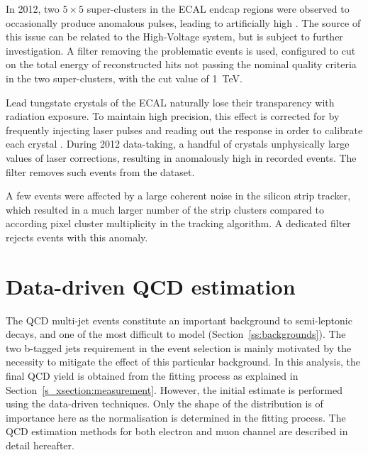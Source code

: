 \begin{description}[wide=\parindent]
	\item[Bad ECAL endcap super-cluster filter.] In 2012, two $5\times5$ super-clusters in the ECAL endcap regions were
	observed to occasionally produce anomalous pulses, leading to artificially high \MET. The source of this issue can
	be related to the High-Voltage system, but is subject to further investigation. A filter removing the problematic
	events is used, configured to cut on the total energy of reconstructed hits not passing the nominal quality criteria
	in the two super-clusters, with the cut value of \SI{1}{\TeV}.

	\item[ECAL laser correction filter.] Lead tungstate crystals of the ECAL naturally lose their transparency with
	radiation exposure. To maintain high precision, this effect is corrected for by frequently injecting laser pulses
	and reading out the response in order to calibrate each crystal \autocite{CMS_TDR1}. During 2012 data-taking, a
	handful of crystals unphysically large values of laser corrections, resulting in anomalously high \MET in recorded
	events. The filter removes such events from the dataset.

	\item[Strip tracker noise filter.] A few events were affected by a large coherent noise in the silicon strip
	tracker, which resulted in a much larger number of the strip clusters compared to according pixel cluster
	multiplicity in the tracking algorithm. A dedicated filter rejects events with this anomaly.

\end{description}

\section{Data-driven QCD estimation}
\label{s_xsection:data_driven_QCD}
The QCD multi-jet events constitute an important background to semi-leptonic \ttbar decays, and one of the most
difficult to model (Section~\ref{ss:backgrounds}). The two b-tagged jets requirement in the event selection is mainly
motivated by the necessity to mitigate the effect of this particular background. In this analysis, the final QCD yield
is obtained from the fitting process as explained in Section~\ref{s_xsection:measurement}. However, the initial estimate
is performed using the data-driven techniques. Only the shape of the distribution is of importance here as the
normalisation is determined in the fitting process. The QCD estimation methods for both electron and muon channel are
described in detail hereafter.

